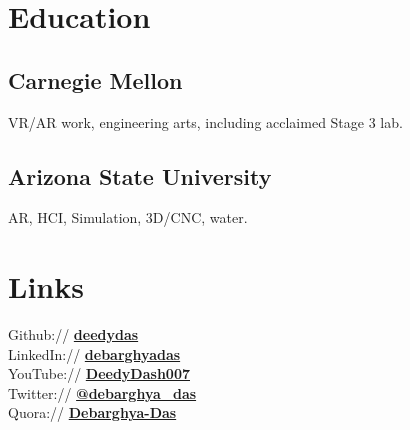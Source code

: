 \documentclass[letterpaper]{deedy-resume} %
\begin{document}
\begin{minipage}[t]{0.33\textwidth} %


\section{Education} 


\subsection{Carnegie Mellon}

VR/AR work, engineering arts,
including acclaimed Stage 3 lab.

\sectionspace %


\subsection{Arizona State University}
AR, HCI, Simulation, 3D/CNC, water.

\sectionspace %


\section{Links} 

Github:// \href{https://github.com/deedydas}{\bf deedydas} \\
LinkedIn:// \href{https://www.linkedin.com/in/debarghyadas}{\bf debarghyadas} \\
YouTube:// \href{https://www.youtube.com/user/DeedyDash007}{\bf DeedyDash007} \\
Twitter:// \href{https://twitter.com/debarghya_das}{\bf @debarghya\_das} \\
Quora:// \href{https://www.quora.com/Debarghya-Das}{\bf Debarghya-Das}


\end{minipage}
\end{document}
